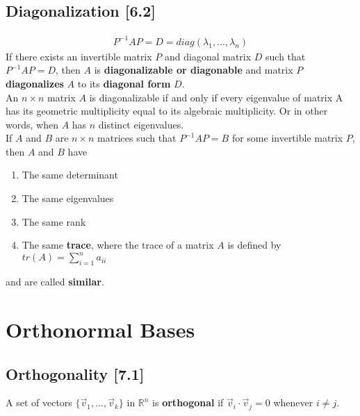 \documentclass[a4paper,9pt]{extarticle}
\begin{document}
\begin{multicols*}{2}

\subsection{Diagonalization [6.2]}
\begin{equation} \label{6.2-1}
    \begin{split}
        P^{-1} A P = D = diag(\lambda_1, ..., \lambda_n)
    \end{split}
\end{equation}
If there exists an invertible matrix $P$ and diagonal matrix $D$ such that $P^{-1} A P = D$, then $A$ is \textbf{diagonalizable or diagonable} and matrix $P$ \textbf{diagonalizes} $A$ to its \textbf{diagonal form} $D$. \\

An $n \times n$ matrix $A$ is diagonalizable if and only if every eigenvalue of matrix A has its geometric multiplicity equal to its algebraic multiplicity. Or in other words, when $A$ has $n$ distinct eigenvalues. \\

If $A$ and $B$ are $n \times n$ matrices such that $P^{-1} A P = B$ for some invertible matrix $P$, then $A$ and $B$ have

\begin{enumerate}[label=\bfseries (\arabic*)] \itemsep0pt \parskip0pt 
    \item The same determinant
    \item The same eigenvalues
    \item The same rank
    \item The same \textbf{trace}, where the trace of a matrix $A$ is defined by $tr(A) = \sum^{n}_{i=1} a_{ii}$
\end{enumerate}

and are called \textbf{similar}.


\section{Orthonormal Bases}


\subsection{Orthogonality [7.1]}
A set of vectors $\{\vec{v}_1, ..., \vec{v}_k\}$ in $\mathbb{R}^n$ is \textbf{orthogonal} if $\vec{v}_i \cdot \vec{v}_j = 0$ whenever $i \neq j$.


\end{multicols*}
\end{document}
